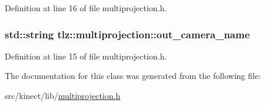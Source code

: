 Definition at line 16 of file multiprojection.\+h.

\subsubsection[{\texorpdfstring{out\+\_\+camera\+\_\+name}{out_camera_name}}]{\setlength{\rightskip}{0pt plus 5cm}std\+::string tlz\+::multiprojection\+::out\+\_\+camera\+\_\+name}\hypertarget{classtlz_1_1multiprojection_ab6ed1594110a2839d5ed43191f695db0}{}\label{classtlz_1_1multiprojection_ab6ed1594110a2839d5ed43191f695db0}


Definition at line 15 of file multiprojection.\+h.



The documentation for this class was generated from the following file\+:\begin{DoxyCompactItemize}
\item 
src/kinect/lib/\hyperlink{multiprojection_8h}{multiprojection.\+h}\end{DoxyCompactItemize}
